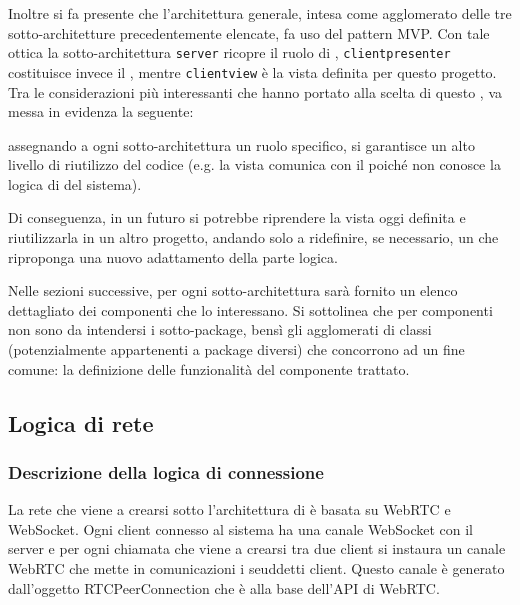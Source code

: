 Inoltre si fa presente che l'architettura generale, intesa come agglomerato delle tre sotto-architetture precedentemente elencate, fa uso del pattern MVP\@.
Con tale ottica la sotto-architettura \texttt{server} ricopre il ruolo di , \texttt{clientpresenter} costituisce invece il , mentre \texttt{clientview} è la vista definita per questo progetto. Tra le considerazioni più interessanti che hanno portato alla scelta di questo , va messa in evidenza la seguente:

assegnando a ogni sotto-architettura un ruolo specifico, si garantisce un alto livello di riutilizzo del codice (e.g. la vista comunica con il  poiché non conosce la logica di  del sistema).

Di conseguenza, in un futuro si potrebbe riprendere la vista oggi definita e riutilizzarla in un altro progetto, andando solo a ridefinire, se necessario, un  che riproponga una nuovo adattamento della parte logica.

Nelle sezioni successive, per ogni sotto-architettura sarà fornito un elenco dettagliato dei componenti che lo interessano. Si sottolinea che per componenti non sono da intendersi i sotto-package, bensì gli agglomerati di classi (potenzialmente appartenenti a package diversi) che concorrono ad un fine comune: la definizione delle funzionalità del componente trattato.
\clearpage

\subsection{Logica di rete}

\subsubsection{Descrizione della logica di connessione}
La rete che viene a crearsi sotto l'architettura di \caName{} è basata su WebRTC e WebSocket. Ogni client connesso al sistema ha una canale WebSocket con il server e per ogni chiamata che viene a crearsi tra due client si instaura un canale WebRTC che mette in comunicazioni i seuddetti client. Questo canale è generato dall'oggetto RTCPeerConnection che è alla base dell'API di WebRTC.

